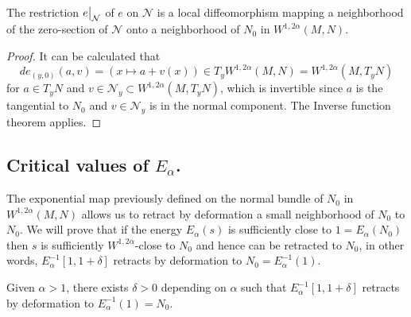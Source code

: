 \begin{lemma}
\label{lem:local-isom-e}
The restriction \(\restr{e}{\mathcal{N}}\) of \(e\) on \(\mathcal{N}\) is a local
diffeomorphism mapping a neighborhood of the zero-section of \(\mathcal{N}\) onto a
neighborhood of \(N_0\) in \(W^{1,2\alpha}(M,N)\).
\end{lemma}
\begin{proof}
It can be calculated that 
\[
  de_{(y,0)}(a,v) = \left(x\mapsto a + v(x)\right) \in T_yW^{1,2\alpha}(M,N) =
W^{1,2\alpha}(M, T_yN)
\]
for \(a\in T_y N\) and \(v\in \mathcal{N}_y \subset W^{1,2\alpha}(M, T_y N)\), which
is invertible since \(a\) is the tangential to \(N_0\) and \(v\in \mathcal{N}_y\) is
in the normal component. The Inverse function theorem applies.
\end{proof}

\subsection{Critical values of \(E_\alpha\).}
\label{sec:orgdc6dba3}

The exponential map previously defined on the normal bundle of \(N_0\) in  \(W^{1,
2\alpha}(M,N)\) allows us to retract by deformation a small neighborhood of \(N_0\) to
\(N_0\). We will prove that if the energy \(E_\alpha(s)\) is sufficiently close to \(1=E_\alpha(N_0)\) then \(s\) is sufficiently \(W^{1,2\alpha}\)-close to \(N_0\) and hence can be retracted to \(N_0\), in other words, \(E_\alpha^{-1}[1, 1+\delta]\) retracts by deformation to \(N_0 = E_\alpha^{-1}(1)\).

\begin{proposition}[]
\label{prop:crit-val-1}
Given \(\alpha>1\), there exists \(\delta >0\) depending on \(\alpha\) such that \(E_\alpha^{-1}[1, 1+\delta]\) retracts by deformation to \(E_\alpha^{-1}(1) = N_0\).
\end{proposition}

